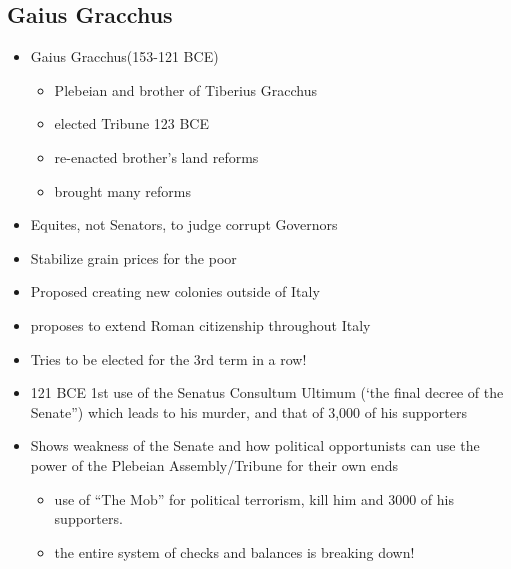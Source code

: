 \documentclass[12pt, twoside]{article}
\begin{document}
\subsection{Gaius Gracchus}
\begin{itemize}
\item Gaius Gracchus(153-121 BCE)
	\begin{itemize}
	\item Plebeian and brother of Tiberius Gracchus
	\item elected Tribune 123 BCE
	\item re-enacted brother's land reforms
	\item brought many reforms
	\end{itemize}
\item Equites, not Senators, to judge corrupt Governors
\item Stabilize grain prices for the poor
\item Proposed creating new colonies outside of Italy
\item proposes to extend Roman citizenship throughout Italy
\item Tries to be elected for the 3rd term in a row!
\item 121 BCE  1st use of the Senatus Consultum Ultimum (‘the final decree of the Senate”)  which leads to his murder, and that of 3,000 of his supporters
\item Shows weakness of the Senate and how political opportunists can use the power of the Plebeian Assembly/Tribune for their own ends
	\begin{itemize}
	\item use of “The Mob” for political terrorism, kill him and 3000 of his supporters.
	\item the entire system of checks and balances is breaking down!
	\end{itemize}
\end{itemize}
\end{document}
